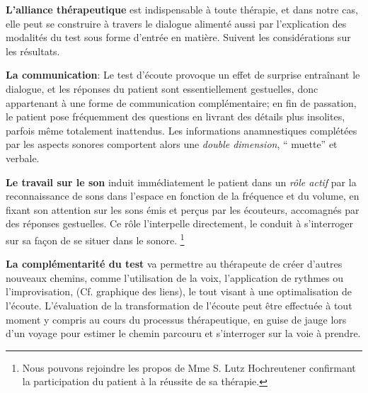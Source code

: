  

   
\textbf{L'alliance thérapeutique} est indispensable à toute
thérapie, et dans notre cas, elle peut se construire à travers le
   dialogue alimenté aussi par l'explication des modalités du test
   sous forme d'entrée en matière.
  Suivent les considérations sur les résultats.

  
\textbf{La communication}:
  Le test d'écoute 
    provoque un effet de surprise entraînant le dialogue, %
   et les réponses du patient sont essentiellement
  gestuelles, donc appartenant à une forme de communication
  complémentaire; 
  en fin de passation, 
 le patient pose fréquemment des questions en livrant des détails plus
 insolites, parfois même totalement inattendus.
Les informations anamnestiques complétées par les aspects sonores
 comportent alors  une \textit{double dimension}, `` muette'' et verbale.
 

\textbf{Le travail sur le son} induit  immédiatement le patient
 dans un \emph{rôle actif} par la reconnaissance de sons dans
 l'espace en fonction de la fréquence et du volume, en fixant son attention sur les
 sons émis et perçus par les écouteurs, accomagnés par des réponses gestuelles.
 Ce rôle l'interpelle directement, le conduit à
    s'interroger sur sa façon de 
    se situer dans le sonore.
\footnote{ Nous pouvons rejoindre les propos de Mme S. Lutz
 Hochreutener confirmant la participation du patient à la réussite de sa thérapie.}
 
  
 \textbf{La complémentarité du test } va permettre au thérapeute
 de créer d'autres nouveaux chemins, comme l'utilisation de la voix,
 l'application de rythmes ou l'improvisation, (Cf. graphique des liens),
 le tout visant 
 à une optimalisation de l'écoute. 
 L'évaluation de la transformation de l'écoute peut être effectuée à
 tout moment y compris au 
 cours du processus thérapeutique, en guise de jauge lors d'un voyage pour estimer le chemin
parcouru et s'interroger sur la voie à prendre.
 
